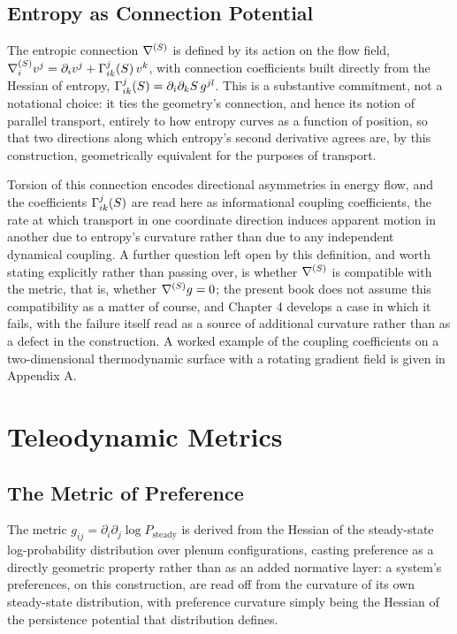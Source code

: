 \chapter{Entropy as Connection Potential}

The entropic connection $\nabla^{(S)}$ is defined by its action on the flow field, $\nabla^{(S)}_i v^j = \partial_i v^j + \Gamma^j_{ik}(S)\, v^k$, with connection coefficients built directly from the Hessian of entropy, $\Gamma^j_{ik}(S) = \partial_i \partial_k S \, g^{jl}$. This is a substantive commitment, not a notational choice: it ties the geometry's connection, and hence its notion of parallel transport, entirely to how entropy curves as a function of position, so that two directions along which entropy's second derivative agrees are, by this construction, geometrically equivalent for the purposes of transport.

Torsion of this connection encodes directional asymmetries in energy flow, and the coefficients $\Gamma^j_{ik}(S)$ are read here as informational coupling coefficients, the rate at which transport in one coordinate direction induces apparent motion in another due to entropy's curvature rather than due to any independent dynamical coupling. A further question left open by this definition, and worth stating explicitly rather than passing over, is whether $\nabla^{(S)}$ is compatible with the metric, that is, whether $\nabla^{(S)} g = 0$; the present book does not assume this compatibility as a matter of course, and Chapter 4 develops a case in which it fails, with the failure itself read as a source of additional curvature rather than as a defect in the construction. A worked example of the coupling coefficients on a two-dimensional thermodynamic surface with a rotating gradient field is given in Appendix A.

\part{Teleodynamic Metrics}

\chapter{The Metric of Preference}

The metric $g_{ij} = \partial_i \partial_j \log P_{\text{steady}}$ is derived from the Hessian of the steady-state log-probability distribution over plenum configurations, casting preference as a directly geometric property rather than as an added normative layer: a system's preferences, on this construction, are read off from the curvature of its own steady-state distribution, with preference curvature simply being the Hessian of the persistence potential that distribution defines.

